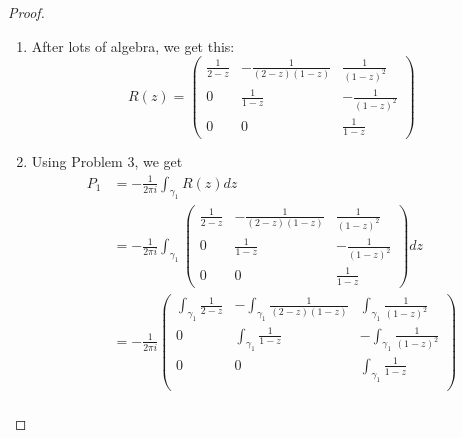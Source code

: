 \documentclass[12pt]{article}
\theoremstyle{definition}
\begin{document}
\begin{proof}
\begin{enumerate}[label=(\alph*)]
\begin{align*}
		      \end{align*}
		      so if we set each one equal to 0, we get in the first case $\lbrace (a, -a, c) \rbrace$, and in the second case $\lbrace (a, 0, 0) \rbrace$ for the kernels.
		\item After lots of algebra, we get this: \begin{equation*}
			      R(z) = \begin{pmatrix}
				      \frac{1}{2-z} & -\frac{1}{(2-z)(1-z)} & \frac{1}{(1-z)^2}  \\
				      0             & \frac{1}{1-z}         & -\frac{1}{(1-z)^2} \\
				      0             & 0                     & \frac{1}{1-z}
			      \end{pmatrix}
		      \end{equation*}
		\item Using Problem 3, we get \begin{align*}
			      P_1 & = -\frac{1}{2\pi i}\int_{\gamma_1} R(z) dz                                                                                 \\
			          & = -\frac{1}{2\pi i}\int_{\gamma_1}\begin{pmatrix}
				                                              \frac{1}{2-z} & -\frac{1}{(2-z)(1-z)} & \frac{1}{(1-z)^2}  \\
				                                              0             & \frac{1}{1-z}         & -\frac{1}{(1-z)^2} \\
				                                              0             & 0                     & \frac{1}{1-z}
			                                              \end{pmatrix}dz                               \\
			          & = -\frac{1}{2\pi i}\begin{pmatrix}
				                               \int_{\gamma_1}\frac{1}{2-z} & -\int_{\gamma_1}\frac{1}{(2-z)(1-z)} & \int_{\gamma_1}\frac{1}{(1-z)^2}  \\
				                               0                            & \int_{\gamma_1}\frac{1}{1-z}         & -\int_{\gamma_1}\frac{1}{(1-z)^2} \\
				                               0                            & 0                                    & \int_{\gamma_1}\frac{1}{1-z}      \\
			                               \end{pmatrix} \\

\end{align*}
\end{enumerate}
\end{proof}
\end{document}
